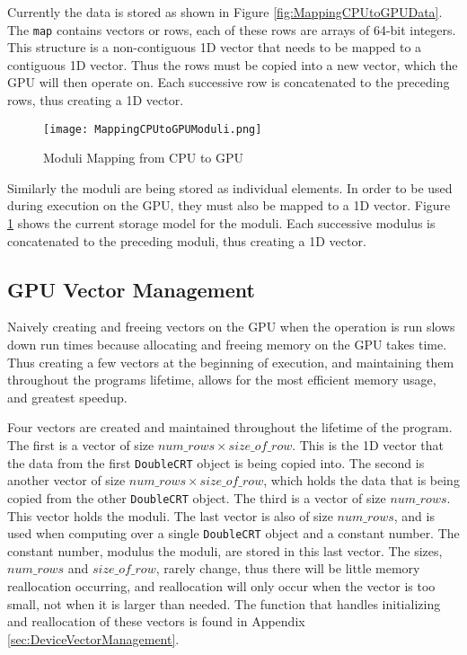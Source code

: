 Currently the data is stored as shown in Figure \ref{fig:MappingCPUtoGPUData}. The \verb|map| contains vectors or rows, each of these rows are arrays of 64-bit integers. This structure is a non-contiguous 1D vector that needs to be mapped to a contiguous 1D vector. Thus the rows must be copied into a new vector, which the GPU will then operate on. Each successive row is concatenated to the preceding rows, thus creating a 1D vector.

\begin{figure}[t!]
\centering
\texttt{[image: MappingCPUtoGPUModuli.png]}
\caption{Moduli Mapping from CPU to GPU}
\label{fig:MappingCPUtoGPUModuli}
\end{figure}

Similarly the moduli are being stored as individual elements. In order to be used during execution on the GPU, they must also be mapped to a 1D vector. Figure \ref{fig:MappingCPUtoGPUModuli} shows the current storage model for the moduli. Each successive modulus is concatenated to the preceding moduli, thus creating a 1D vector.

\subsection{GPU Vector Management}
Naively creating and freeing vectors on the GPU when the operation is run slows down run times because allocating and freeing memory on the GPU takes time. Thus creating a few vectors at the beginning of execution, and maintaining them throughout the programs lifetime, allows for the most efficient memory usage, and greatest speedup.

Four vectors are created and maintained throughout the lifetime of the program. The first is a vector of size $num\_rows \times size\_of\_row$. This is the 1D vector that the data from the first \verb|DoubleCRT| object is being copied into. The second is another vector of size $num\_rows \times size\_of\_row$, which holds the data that is being copied from the other \verb|DoubleCRT| object. The third is a vector of size $num\_rows$. This vector holds the moduli. The last vector is also of size $num\_rows$, and is used when computing over a single \verb|DoubleCRT| object and a constant number. The constant number, modulus the moduli, are stored in this last vector. The sizes, $num\_rows$ and $size\_of\_row$, rarely change, thus there will be little memory reallocation occurring, and reallocation will only occur when the vector is too small, not when it is larger than needed. The function that handles initializing and reallocation of these vectors is found in Appendix \ref{sec:DeviceVectorManagement}.

